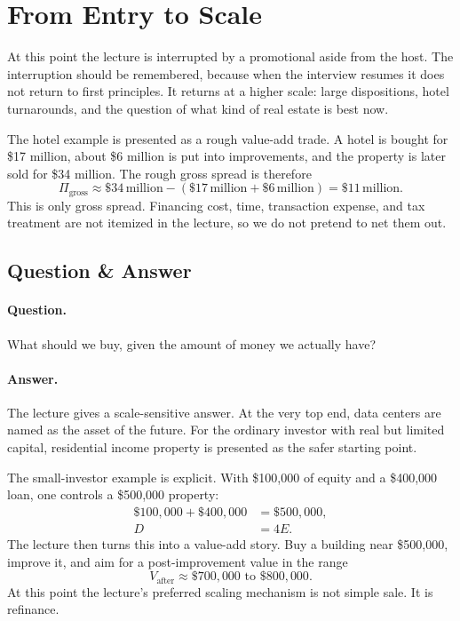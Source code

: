 \section{From Entry to Scale}

At this point the lecture is interrupted by a promotional aside from the host. The interruption should be remembered, because when the interview resumes it does not return to first principles. It returns at a higher scale: large dispositions, hotel turnarounds, and the question of what kind of real estate is best now.

The hotel example is presented as a rough value-add trade. A hotel is bought for \$17 million, about \$6 million is put into improvements, and the property is later sold for \$34 million. The rough gross spread is therefore
\begin{equation}
\Pi_{\text{gross}} \approx \$34\,\text{million} - (\$17\,\text{million} + \$6\,\text{million}) = \$11\,\text{million}.
\end{equation}
This is only gross spread. Financing cost, time, transaction expense, and tax treatment are not itemized in the lecture, so we do not pretend to net them out.

\subsection{Question \& Answer}

\paragraph{Question.} What should we buy, given the amount of money we actually have?

\paragraph{Answer.} The lecture gives a scale-sensitive answer. At the very top end, data centers are named as the asset of the future. For the ordinary investor with real but limited capital, residential income property is presented as the safer starting point.

The small-investor example is explicit. With \$100,000 of equity and a \$400,000 loan, one controls a \$500,000 property:
\begin{align}
\$100{,}000 + \$400{,}000 &= \$500{,}000,\\
D &= 4E.
\end{align}
The lecture then turns this into a value-add story. Buy a building near \$500,000, improve it, and aim for a post-improvement value in the range
\begin{equation}
V_{\text{after}} \approx \$700{,}000 \text{ to } \$800{,}000.
\end{equation}
At this point the lecture's preferred scaling mechanism is not simple sale. It is refinance.

